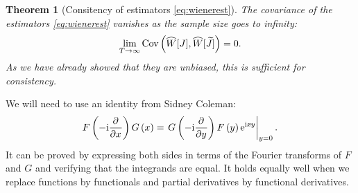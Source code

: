 \documentclass[12pt]{article}
\theoremstyle{slplain}
\newtheorem{thm}{Theorem}
\theoremstyle{sldefinition}
\theoremstyle{remark}
\newcommand{\tj}{\widetilde{J}}
\newcommand{\hw}{\widehat{W}}
\begin{document}
\begin{thm}[Consitency of estimators \eqref{eq:wienerest}]\label{th:wienercons}
  The covariance of the estimators \eqref{eq:wienerest} vanishes as the sample size goes to infinity:
  \begin{equation}\label{eq:wienercons}
    \lim_{T\to\infty} \cov\prn{ \hw[J], \hw[\tj] } = 0.
  \end{equation}
  As we have already showed that they are unbiased, this is sufficient for consistency.
\end{thm}
%
We will need to use an identity from Sidney Coleman:
%
\begin{equation}\label{eq:coleman}
  F\prn{-\ir\pdiff{}{x}} G\prn{x} = \left. G\prn{-\ir\pdiff{}{y}} F\prn{y} \e^{\ir x \cdt y} \right|_{y=0}.
\end{equation}
%
It can be proved by expressing both sides in terms of the Fourier transforms of $F$ and $G$ and verifying that the integrands are equal. It holds equally well when we replace functions by functionals and partial derivatives by functional derivatives.
%
\end{document}
